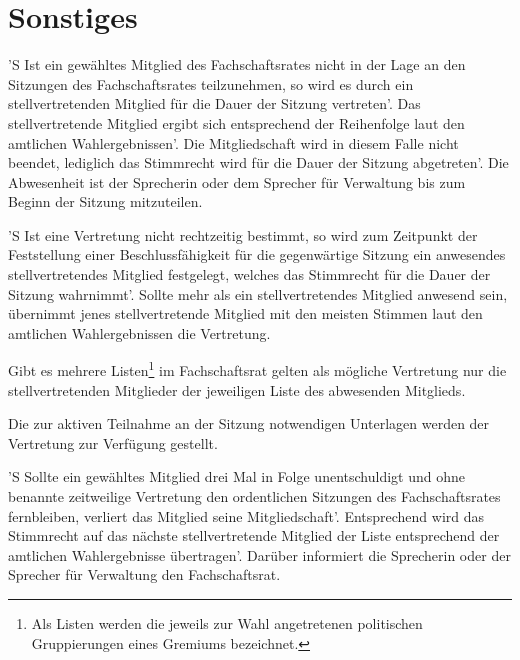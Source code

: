 \documentclass[%
	parskip=half,
]{scrartcl}
\newcommand{\edit}[1]{{\color{red} #1}}
\newcommand{\add}[1]{{\color{blue} #1}}
\begin{document}
\section{Sonstiges}

\begin{contract}


'S Ist ein gewähltes Mitglied des Fachschaftsrates nicht in der Lage an den Sitzungen des Fachschaftsrates 
teilzunehmen, so wird es durch ein stellvertretenden Mitglied für die Dauer der Sitzung vertreten'. Das 
stellvertretende Mitglied ergibt sich entsprechend der Reihenfolge laut den amtlichen Wahlergebnissen'. Die 
Mitgliedschaft wird in diesem Falle nicht beendet, lediglich das Stimmrecht wird für die Dauer der Sitzung abgetreten'. 
Die Abwesenheit ist \edit{der Sprecherin oder dem Sprecher} für Verwaltung bis zum Beginn der Sitzung mitzuteilen.

'S Ist eine Vertretung nicht rechtzeitig bestimmt, so wird zum Zeitpunkt der Feststellung \edit{einer} 
Beschlussfähigkeit \edit{für die gegenwärtige} Sitzung \edit{ein anwesendes stellvertretendes Mitglied} festgelegt, 
\edit{welches} das Stimmrecht für die Dauer der Sitzung wahrnimmt'. Sollte mehr als ein stellvertretendes Mitglied 
anwesend sein, übernimmt \edit{jenes stellvertretende} Mitglied mit den meisten Stimmen laut den amtlichen 
Wahlergebnissen die Vertretung.

Gibt es mehrere Listen\footnote{\add{Als Listen werden die jeweils zur Wahl angetretenen politischen Gruppierungen 
eines Gremiums bezeichnet.}} im Fachschaftsrat gelten als mögliche Vertretung nur die \edit{stellvertretenden 
Mitglieder} der 
jeweiligen Liste des abwesenden Mitglieds.

Die \edit{zur aktiven Teilnahme an der} Sitzung notwendigen Unterlagen werden der Vertretung zur Verfügung gestellt.

'S Sollte ein gewähltes Mitglied drei Mal in Folge unentschuldigt und ohne benannte zeitweilige Vertretung den 
ordentlichen Sitzungen des Fachschaftsrates fernbleiben, verliert das Mitglied seine Mitgliedschaft'. Entsprechend wird 
das Stimmrecht auf \edit{das nächste stellvertretende Mitglied der Liste entsprechend} der amtlichen Wahlergebnisse 
übertragen'. Darüber informiert \edit{die Sprecherin oder der Sprecher} für Verwaltung den Fachschaftsrat.



\end{contract}
\end{document}
